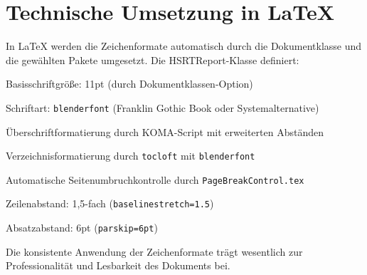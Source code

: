 \section{Technische Umsetzung in \LaTeX}
\label{sec:technische_umsetzung}

In \LaTeX{} werden die Zeichenformate automatisch durch die Dokumentklasse und die gewählten Pakete umgesetzt. Die HSRTReport-Klasse definiert:
\begin{listenabsatz}
	\item Basisschriftgröße: 11pt (durch Dokumentklassen-Option)
	\item Schriftart: \texttt{blenderfont} (Franklin Gothic Book oder Systemalternative)
	\item Überschriftformatierung durch KOMA-Script mit erweiterten Abständen
	\item Verzeichnisformatierung durch \texttt{tocloft} mit \texttt{blenderfont}
	\item Automatische Seitenumbruchkontrolle durch \texttt{PageBreakControl.tex}
	\item Zeilenabstand: 1,5-fach (\texttt{baselinestretch=1.5})
	\item Absatzabstand: 6pt (\texttt{parskip=6pt})
\end{listenabsatz}

Die konsistente Anwendung der Zeichenformate trägt wesentlich zur Professionalität und Lesbarkeit des Dokuments bei.

